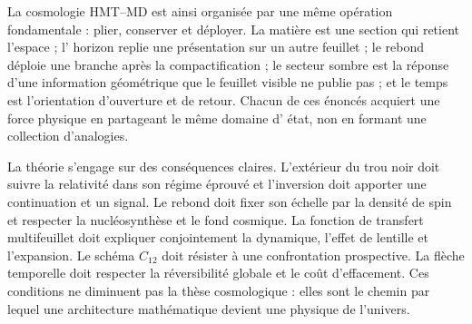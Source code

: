 La cosmologie HMT--MD est ainsi organisée par une même opération fondamentale :
plier, conserver et déployer. La matière est une section qui retient l'espace ; l'
horizon replie une présentation sur un autre feuillet ; le rebond déploie une branche après
la compactification ; le secteur sombre est la réponse d'une information géométrique que
le feuillet visible ne publie pas ; et le temps est l'orientation d'ouverture et de retour.
Chacun de ces énoncés acquiert une force physique en partageant le même domaine d'
état, non en formant une collection d'analogies.

La théorie s'engage sur des conséquences claires. L'extérieur du trou noir doit
suivre la relativité dans son régime éprouvé et l'inversion doit apporter une
continuation et un signal. Le rebond doit fixer son échelle par la densité de
spin et respecter la nucléosynthèse et le fond cosmique. La fonction de transfert
multifeuillet doit expliquer conjointement la dynamique, l'effet de lentille et l'expansion. Le schéma
\(C_{12}\) doit résister à une confrontation prospective. La flèche temporelle doit
respecter la réversibilité globale et le coût d'effacement. Ces conditions ne diminuent pas la
thèse cosmologique : elles sont le chemin par lequel une architecture mathématique devient
une physique de l'univers.

